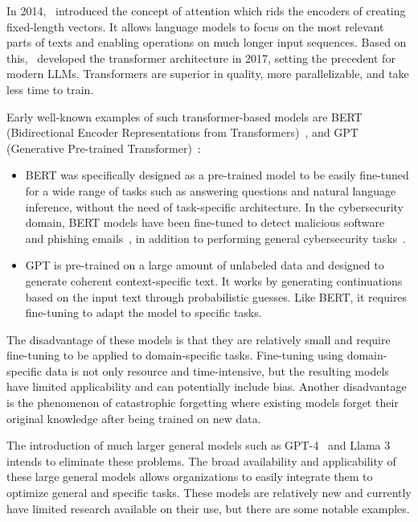 In 2014,\ \citet{bahdanau2014neural} introduced the concept of attention which rids the encoders of creating
fixed-length vectors.
It allows language models to focus on the most relevant parts of texts and enabling operations on much longer input
sequences.
Based on this,\ \citet{vaswani2017attention} developed the transformer architecture in 2017, setting the precedent for
modern LLMs.
Transformers are superior in quality, more parallelizable, and take less time to train.

Early well-known examples of such transformer-based models are BERT
(Bidirectional Encoder Representations from Transformers)\ \citep{devlin2018bert}, and
GPT (Generative Pre-trained Transformer)\ \citep{radford2018improving}:
\begin{itemize}
    \item BERT was specifically designed as a pre-trained model to be easily fine-tuned for a wide range of tasks such
    as answering questions and natural language inference, without the need of task-specific architecture.
    In the cybersecurity domain, BERT models have been fine-tuned to detect malicious
    software\ \citep{rahali2021malbert} and phishing emails\ \citep{lee2020catbert}, in addition to performing general
    cybersecurity tasks\ \citep{bayer2024cysecbert}.

    \item GPT is pre-trained on a large amount of unlabeled data and designed to generate coherent context-specific
    text.
    It works by generating continuations based on the input text through probabilistic guesses.
    Like BERT, it requires fine-tuning to adapt the model to specific tasks.
\end{itemize}

The disadvantage of these models is that they are relatively small and require fine-tuning to be applied to
domain-specific tasks.
Fine-tuning using domain-specific data is not only resource and time-intensive, but the resulting models have limited
applicability and can potentially include bias.
Another disadvantage is the phenomenon of catastrophic forgetting where existing models forget their original knowledge
after being trained on new data.

The introduction of much larger general models such as GPT-4\ \citep{achiam2023gpt} and Llama 3\ \citep{meta:llama3}
intends to eliminate these problems.
The broad availability and applicability of these large general models allows organizations to easily integrate them to
optimize general and specific tasks.
These models are relatively new and currently have limited research available on their use, but there are some notable
examples.


